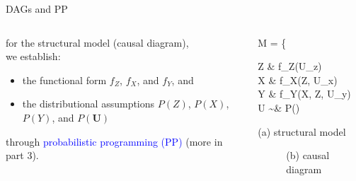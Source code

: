 %
%
\begin{frame}
	{DAGs and PP}
	\begin{columns}
		\begin{column}{0.5\textwidth}
			for the structural model (causal diagram), \\
			we establish:
			\begin{itemize}
				\item the functional form $f_{Z}$, $f_{X}$, and $f_{Y}$, and
				\item the distributional assumptions $P(Z)$, $P(X)$, $P(Y)$, and $P(\pmb{U})$
			\end{itemize}
			through \textcolor{blue}{probabilistic programming (PP)} \cite{Jaynes_2003} \alert{(more in part 3)}.
		\end{column}
		\begin{column}{0.5\textwidth}  
			\begin{equ}
				M = \left\{ \begin{aligned} 
					Z \leftarrow & \; f_{Z}(U_{z}) \\
					X \leftarrow & \; f_{X}(Z, U_{x}) \\
					Y \leftarrow & \; f_{Y}(X, Z, U_{y}) \\
					U \sim & \; P()
				\end{aligned} \right
				\caption*{(a) structural model}
			\end{equ}
			\begin{figure}
				\caption*{(b) causal diagram }
			\end{figure}
		\end{column}
	\end{columns}
\end{frame}

